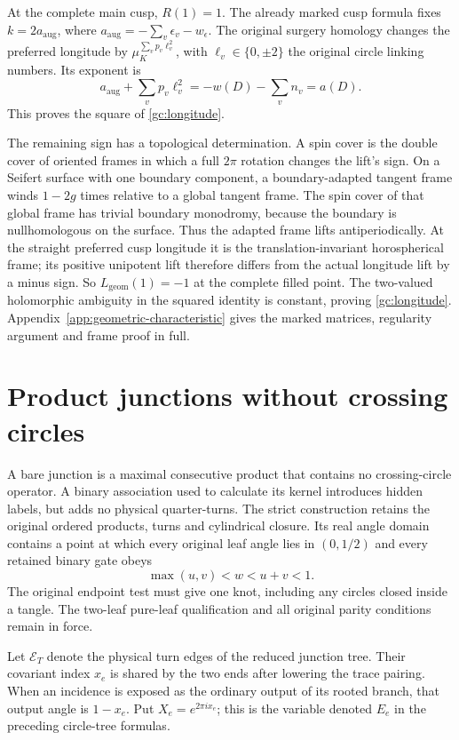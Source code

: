 At the complete main cusp, $R(1)=1$. The already marked cusp
formula fixes $k=2a_{\mathrm{aug}}$, where
$a_{\mathrm{aug}}=-\sum_v\epsilon_v-w_\epsilon$.
The original surgery homology changes the preferred longitude by
$\mu_K^{\sum_vp_v\ell_v^2}$, with
$\ell_v\in\{0,\pm2\}$ the original circle linking numbers.
Its exponent is
\[
 a_{\mathrm{aug}}+\sum_vp_v\ell_v^2
             =-w(D)-\sum_vn_v=a(D).
\]
This proves the square of \eqref{gc:longitude}.

The remaining sign has a topological determination. A spin cover
is the double cover of oriented frames in which a full $2\pi$
rotation changes the lift's sign. On a Seifert
surface with one boundary component, a boundary-adapted tangent
frame winds $1-2g$ times relative to a global tangent frame.
The spin cover of that global frame has trivial boundary
monodromy, because the boundary is nullhomologous on the surface.
Thus the adapted frame lifts antiperiodically. At the straight
preferred cusp longitude it is the translation-invariant
horospherical frame; its positive unipotent lift therefore differs
from the actual longitude lift by a minus sign.
So $L_{\mathrm{geom}}(1)=-1$ at the complete filled point.
The two-valued holomorphic ambiguity in the squared identity is
constant, proving \eqref{gc:longitude}.
Appendix~\ref{app:geometric-characteristic} gives the marked
matrices, regularity argument and frame proof in full.

\section{Product junctions without crossing circles}
\label{gc:strict-extension}

A bare junction is a maximal consecutive product that contains no
crossing-circle operator. A binary association used to calculate its
kernel introduces hidden labels, but adds no physical quarter-turns.
The strict construction retains the original ordered products,
turns and cylindrical closure. Its real angle domain contains a
point at which every original leaf angle lies in $(0,1/2)$ and
every retained binary gate obeys
\[
                 \max(u,v)<w<u+v<1.
\]
The original endpoint test must give one knot, including any circles
closed inside a tangle. The two-leaf pure-leaf qualification and all
original parity conditions remain in force.

Let $\mathcal E_T$ denote the physical turn edges of the reduced
junction tree. Their covariant index $x_e$ is shared by the two ends
after lowering the trace pairing. When an incidence is exposed as
the ordinary output of its rooted branch, that output angle is
$1-x_e$. Put $X_e=e^{2\pi ix_e}$; this is the variable denoted $E_e$
in the preceding circle-tree formulas.

